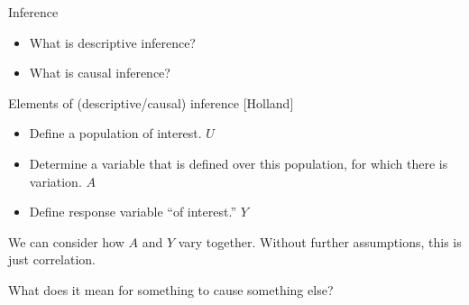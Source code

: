\documentclass[xcolor={dvipsnames},handout]{beamer}
\begin{document}

\begin{frame}{Inference}

\begin{itemize}
\item What is descriptive inference?
\item What is causal inference?
\end{itemize}

\end{frame}



\begin{frame}{Elements of (descriptive/causal) inference [Holland]}
\citep{holland1986statistics}

\begin{itemize}
\item Define a population of interest. $U$
\item Determine a variable that is defined over this population, for which there is variation. $A$
\item Define response variable ``of interest.'' $Y$ 
\end{itemize}

We can consider how $A$ and $Y$ vary together. Without further assumptions, this is just correlation. 

\end{frame}



\begin{frame}

\begin{center}
What does it mean for something to cause something else?
\end{center}

\end{frame}
\end{document}

